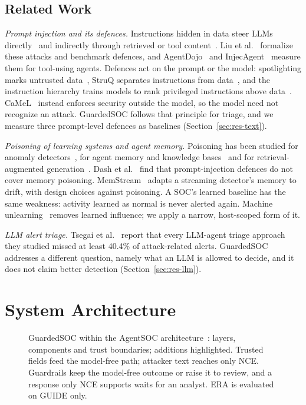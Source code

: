 \documentclass[conference]{IEEEtran}
\begin{document}
\subsection{Related Work}

\emph{Prompt injection and its defences.} Instructions hidden in data steer LLMs directly~\cite{perez} and
indirectly through retrieved or tool content~\cite{greshake}. Liu et al.~\cite{liu} formalize these attacks and
benchmark defences, and AgentDojo~\cite{agentdojo} and InjecAgent~\cite{injecagent} measure them for tool-using
agents. Defences act on the prompt or the model: spotlighting marks untrusted data~\cite{spotlighting}, StruQ
separates instructions from data~\cite{struq}, and the instruction hierarchy trains models to rank privileged
instructions above data~\cite{hierarchy}. CaMeL~\cite{camel} instead enforces security outside the model, so the
model need not recognize an attack. GuardedSOC follows that principle for triage, and we measure three prompt-level
defences as baselines (Section~\ref{sec:res-text}).

\emph{Poisoning of learning systems and agent memory.} Poisoning has been studied for anomaly
detectors~\cite{antidote}, for agent memory and knowledge bases~\cite{agentpoison,memorypoison} and for
retrieval-augmented generation~\cite{poisonedrag}. Dash et al.~\cite{memorypoison} find that prompt-injection
defences do not cover memory poisoning. MemStream~\cite{memstream} adapts a streaming detector's memory to drift,
with design choices against poisoning. A SOC's learned baseline has the same weakness: activity learned as normal
is never alerted again. Machine unlearning~\cite{unlearning} removes learned influence; we apply a narrow,
host-scoped form of it.

\emph{LLM alert triage.} Tsegai et al.~\cite{tsegai} report that every LLM-agent triage approach they studied
missed at least 40.4\% of attack-related alerts. GuardedSOC addresses a different question, namely what an LLM is
allowed to decide, and it does not claim better detection (Section~\ref{sec:res-llm}).

\section{System Architecture}\label{sec:arch}

\begin{figure}[!t]
\centering

\caption{GuardedSOC within the AgentSOC architecture~\cite{agentsoc}: layers, components and trust boundaries;
additions highlighted. Trusted fields feed the model-free path; attacker text reaches only NCE. Guardrails keep the
model-free outcome or raise it to review, and a response only NCE supports waits for an analyst. ERA is evaluated
on GUIDE only.}
\label{fig:system}
\end{figure}
\end{document}

